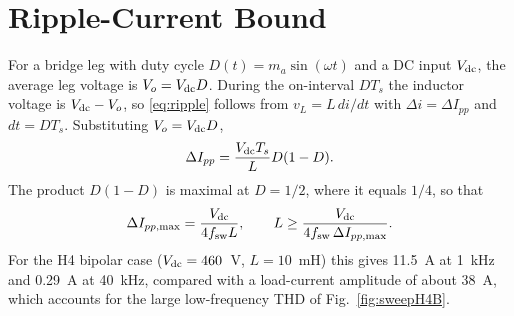\section{Ripple-Current Bound}
\label{app:ripple}
For a bridge leg with duty cycle $D(t)=m_a\sin(\omega t)$ and a DC input $V_{\mathrm{dc}}$, the average leg voltage is $V_o=V_{\mathrm{dc}} D$. During the on-interval $DT_s$ the inductor voltage is $V_{\mathrm{dc}}-V_o$, so \eqref{eq:ripple} follows from $v_L=L\,di/dt$ with $\Delta i=\Delta I_{pp}$ and $dt=DT_s$. Substituting $V_o=V_{\mathrm{dc}} D$,
\begin{equation}
\Delta I_{pp}=\frac{V_{\mathrm{dc}} T_s}{L}D(1-D).
\end{equation}
The product $D(1-D)$ is maximal at $D=1/2$, where it equals $1/4$, so that
\begin{equation}
\Delta I_{pp,\max}=\frac{V_{\mathrm{dc}}}{4f_{\mathrm{sw}} L},\qquad L\geq\frac{V_{\mathrm{dc}}}{4f_{\mathrm{sw}}\,\Delta I_{pp,\max}}.
\end{equation}
For the H4 bipolar case ($V_{\mathrm{dc}}=460$~V, $L=10$~mH) this gives 11.5~A at 1~kHz and 0.29~A at 40~kHz, compared with a load-current amplitude of about 38~A, which accounts for the large low-frequency THD of Fig.~\ref{fig:sweepH4B}.
